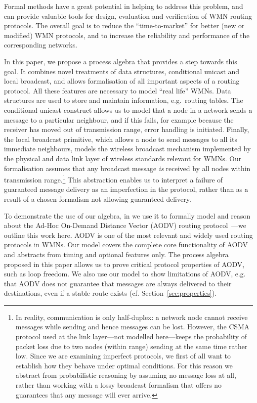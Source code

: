 \documentclass[envcountsame,envcountsect,orivec,runningheads]{llncs}
\begin{document}
Formal methods have a great potential in helping to address this
problem, and can provide valuable tools for design, evaluation and
verification of WMN routing protocols. The overall goal is to reduce
the ``time-to-market'' for better (new or modified) WMN protocols, and
to increase the reliability and performance of the corresponding
networks.  \pagebreak[3]

In this paper, we propose a process algebra that provides a step
towards this goal.  It combines novel treatments of 
data structures, conditional unicast and
local broadcast, and allows formalisation of
all important aspects of a routing protocol.
All these features are necessary to model 
``real life'' WMNs.
Data structures are used to store and maintain information, e.g.\ routing 
tables. The conditional unicast construct allows us to
model that a node in a network sends a message to a particular neighbour,
and if this fails, for example because the receiver has moved out of transmission range, error handling
is initiated. 
Finally, the local broadcast primitive, which allows a node to send messages to all 
its immediate neighbours, models
the wireless broadcast mechanism implemented by the physical and 
data link layer of wireless standards relevant for WMNs.
Our formalisation assumes that any broadcast message \emph{is}
received by all nodes within transmission range.\footnote{In reality, communication is only
half-duplex: a network node cannot receive messages while sending and hence
messages can be lost.
However, the CSMA protocol used at the link layer---not modelled
here---keeps the probability of packet loss due to two nodes (within
range) sending at the same time rather low.
Since we are examining imperfect protocols, we first of all want to
establish how they behave under optimal conditions. For this reason we
abstract from probabilistic reasoning by assuming no message loss at
all, rather than working with a lossy broadcast formalism that offers
no guarantees that any message will ever arrive.}
This abstraction enables us to interpret a
failure of guaranteed message delivery as an imperfection in the protocol, rather than as a
result of a chosen formalism not allowing guaranteed delivery.

To demonstrate the use
of our algebra, in \cite{TR11} we use it to formally model and reason
about the Ad-Hoc On-Demand Distance Vector (AODV) routing
protocol~\cite{rfc3561}---we outline this work here.
AODV is one of the most relevant and widely
used routing protocols in WMNs. Our model covers the complete core
functionality of AODV and abstracts from timing and optional features only.
The process algebra proposed in this paper allows us to prove critical protocol properties of
AODV, such as loop freedom. We also use our model to show limitations of AODV, e.g. that AODV does not guarantee
that messages are always delivered to their destinations, even if
 a stable route exists (cf. Section~\ref{sec:properties}).
\end{document}
